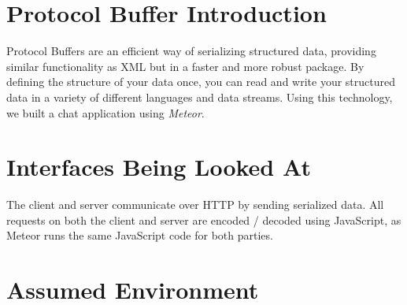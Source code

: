 \documentclass[11pt]{article} %
\begin{document}
%
%
%

\section{Protocol Buffer Introduction}

Protocol Buffers are an efficient way of serializing structured data, providing similar functionality as XML but in a faster and more robust package. By defining the structure of your data once, you can read and write your structured data in a variety of different languages and data streams. Using this technology, we built a chat application using \textit{Meteor}. 

\section{Interfaces Being Looked At}


The client and server communicate over HTTP by sending serialized data. All requests on both the client and server are encoded / decoded using JavaScript, as Meteor runs the same JavaScript code for both parties. 

\section{Assumed Environment}

\end{document}
